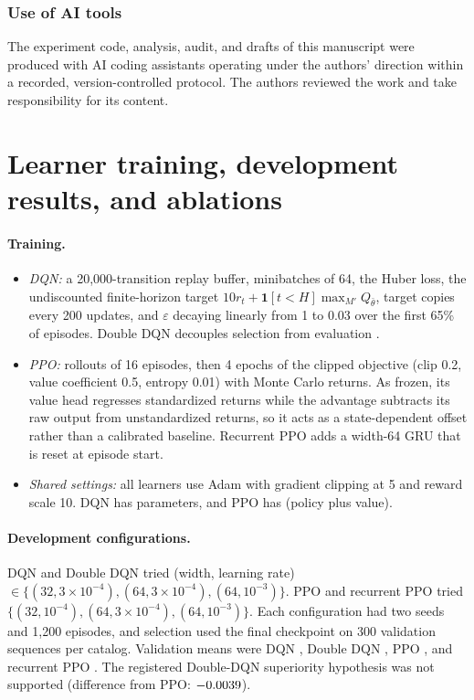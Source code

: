 \documentclass[10pt]{article}
\begin{document}
\subsubsection*{Use of AI tools}
The experiment code, analysis, audit, and drafts of this manuscript were produced with AI coding assistants operating under the authors' direction within a recorded, version-controlled protocol. The authors reviewed the work and take responsibility for its content.




\appendix

\section{Learner training, development results, and ablations}\label{app:training}

\paragraph{Training.}
\begin{itemize}[leftmargin=*]
  \item \emph{DQN:} a 20{,}000-transition replay buffer, minibatches of 64, the Huber loss, the undiscounted finite-horizon target $10r_t+\mathbf 1[t<H]\max_{M'}Q_{\bar\theta}$, target copies every 200 updates, and $\varepsilon$ decaying linearly from 1 to 0.03 over the first 65\% of episodes. Double DQN decouples selection from evaluation \citep{vanhasselt2016deep}.
  \item \emph{PPO:} rollouts of 16 episodes, then 4 epochs of the clipped objective (clip 0.2, value coefficient 0.5, entropy 0.01) with Monte Carlo returns. As frozen, its value head regresses standardized returns while the advantage subtracts its raw output from unstandardized returns, so it acts as a state-dependent offset rather than a calibrated baseline. Recurrent PPO adds a width-64 GRU that is reset at episode start.
  \item \emph{Shared settings:} all learners use Adam \citep{kingma2015adam} with gradient clipping at 5 and reward scale 10. DQN has \paramsDQN{} parameters, and PPO has \paramsPPO{} (policy plus value).
\end{itemize}

\paragraph{Development configurations.} DQN and Double DQN tried (width, learning rate) $\in\{(32,3{\times}10^{-4}),(64,3{\times}10^{-4}),(64,10^{-3})\}$. PPO and recurrent PPO tried $\{(32,10^{-4}),(64,3{\times}10^{-4}),(64,10^{-3})\}$. Each configuration had two seeds and 1{,}200 episodes, and selection used the final checkpoint on 300 validation sequences per catalog. Validation means were DQN \develDQN, Double DQN \develDDQN, PPO \develPPO, and recurrent PPO \develRPPO. The registered Double-DQN superiority hypothesis was not supported (difference from PPO: $-0.0039$).
\end{document}

